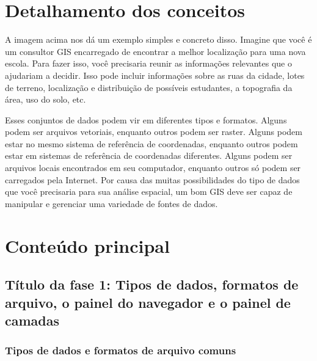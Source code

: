\documentclass[
]{book}
\begin{document}
\hypertarget{detalhamento-dos-conceitos-1}{%
\section{Detalhamento dos conceitos}\label{detalhamento-dos-conceitos-1}}

A imagem acima nos dá um exemplo simples e concreto disso. Imagine que você é um consultor GIS encarregado de encontrar a melhor localização para uma nova escola. Para fazer isso, você precisaria reunir as informações relevantes que o ajudariam a decidir. Isso pode incluir informações sobre as ruas da cidade, lotes de terreno, localização e distribuição de possíveis estudantes, a topografia da área, uso do solo, etc.

Esses conjuntos de dados podem vir em diferentes tipos e formatos. Alguns podem ser arquivos vetoriais, enquanto outros podem ser raster. Alguns podem estar no mesmo sistema de referência de coordenadas, enquanto outros podem estar em sistemas de referência de coordenadas diferentes. Alguns podem ser arquivos locais encontrados em seu computador, enquanto outros só podem ser carregados pela Internet. Por causa das muitas possibilidades do tipo de dados que você precisaria para sua análise espacial, um bom GIS deve ser capaz de manipular e gerenciar uma variedade de fontes de dados.

\hypertarget{conteuxfado-principal-2}{%
\section{Conteúdo principal}\label{conteuxfado-principal-2}}

\hypertarget{tuxedtulo-da-fase-1-tipos-de-dados-formatos-de-arquivo-o-painel-do-navegador-e-o-painel-de-camadas}{%
\subsection{Título da fase 1: Tipos de dados, formatos de arquivo, o painel do navegador e o painel de camadas}\label{tuxedtulo-da-fase-1-tipos-de-dados-formatos-de-arquivo-o-painel-do-navegador-e-o-painel-de-camadas}}

\hypertarget{tipos-de-dados-e-formatos-de-arquivo-comuns}{%
\subsubsection{\texorpdfstring{\textbf{Tipos de dados e formatos de arquivo comuns}}{Tipos de dados e formatos de arquivo comuns}}\label{tipos-de-dados-e-formatos-de-arquivo-comuns}}
\end{document}
